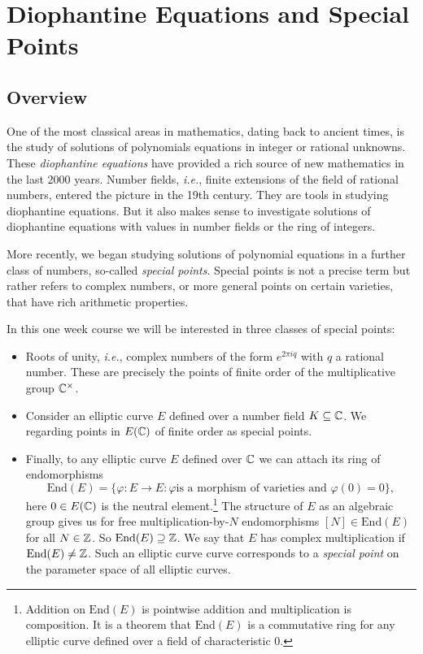 \chapter{Diophantine Equations and Special Points}

\section{Overview}

One of the most classical areas in mathematics, dating back to ancient
times, is the study of solutions of polynomials equations in integer
or rational unknowns. These \textit{diophantine equations} have
provided a rich source of new mathematics in the last 2000 years.
Number fields, \textit{i.e.}, finite extensions of the field of
rational numbers, entered the picture in the 19th century. They are
tools in studying diophantine equations. But it also makes sense to
investigate solutions of diophantine equations with values in number
fields or the ring of integers.

More recently, we began studying solutions of polynomial equations in
a further class of numbers, so-called \textit{special points}. Special
points is not a precise term but rather refers to complex numbers, or
more general points on certain varieties, that have rich arithmetic
properties.

In this one week course we will be interested in three classes of
special points:
\begin{itemize}
\item Roots of unity, \textit{i.e.}, complex numbers of the form
  $e^{2\pi i q}$ with $q$ a rational number. These are precisely the
  points of finite order of the multiplicative group ${\mathbb{C}}^\times$. 

\item Consider an elliptic curve $E$ defined over a number field
  $K\subseteq{\mathbb{C}}$. We regarding points in $E({\mathbb{C}})$ of finite order as
  special points.

\item Finally, to any elliptic curve $E$ defined over ${\mathbb{C}}$ we can
  attach its ring of endomorphisms
  $$\mathrm{End}(E) = \{\varphi \colon E\rightarrow E : \varphi\text{
    is a morphism of varieties and }\varphi(0)=0\},$$
  here $0\in E({\mathbb{C}})$ is the neutral element.\footnote{Addition on
    $\mathrm{End}(E)$ is pointwise addition and multiplication is
    composition. It is a theorem that $\mathrm{End}(E)$ is a
    commutative ring for any elliptic curve defined over a field of
    characteristic $0$.}
  The  structure of $E$ as an algebraic group gives us for free
  multiplication-by-$N$ endomorphisms $[N] \in \mathrm{End}(E)$ for
  all $N\in{\mathbb{Z}}$. So $\mathrm{End}(E) \supseteq {\mathbb{Z}}$.
  We say that $E$ has complex multiplication if
  $\mathrm{End}(E)\not={\mathbb{Z}}$.
  Such an elliptic curve curve corresponds to a \textit{special point}
  on the parameter space of all elliptic curves.   
\end{itemize}

